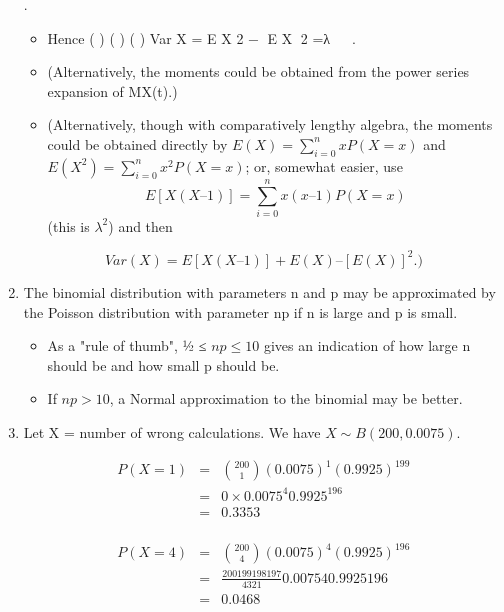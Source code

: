 \documentclass[a4paper,12pt]{article}
\begin{document}
\begin{enumerate}

.
\begin{itemize}
    \item Hence ( ) ( ) ( ) Var X = E X 2 − E X 2 =λ   .
    \item (Alternatively, the moments could be obtained from the power series
expansion of MX(t).)
    \item (Alternatively, though with comparatively lengthy algebra, the
moments could be obtained directly by $E(X) = \sum^{n}_{i=0}xP(X = x)$ and $E(X^2) =
\sum^{n}_{i=0}x^2P(X = x)$; or, somewhat easier, use \[E[X(X – 1)] = \sum^{n}_{i=0} x(x – 1)P(X = x)\]
(this is $\lambda^2$) and then 
\end{itemize}

\[Var(X) = E[X(X – 1)] + E(X) – [E(X)]^2.)\]
\item  The binomial distribution with parameters n and p may be
approximated by the Poisson distribution with parameter np if n is large and p is small.
\begin{itemize}
    \item  As a "rule of thumb", ½ ≤ $np \leq 10$ gives an
indication of how large n should be and how small p should be. 
    \item If
$np > 10$, a Normal approximation to the binomial may be better.
\end{itemize}


\item  Let X = number of wrong calculations. We have $X \sim B(200, 0.0075)$.

\begin{eqnarray*}
P(X=1) &=& { 200 \choose 1}(0.0075)^1(0.9925)^{199} \\
&=& 0 \times  0.0075^4 0.9925^{196}\\
&=& 0.3353\\
\end{eqnarray*}

\begin{eqnarray*}
P(X=4) &=& { 200 \choose 4}(0.0075)^4(0.9925)^{196} \\
&=& \frac{200 199 198 197}{4 3 2 1} 0.00754 0.9925196\\
&=& 0.0468\\
\end{eqnarray*}
\newpage
\begin{framed}
 

\end{framed}
\end{enumerate}
\end{document}
